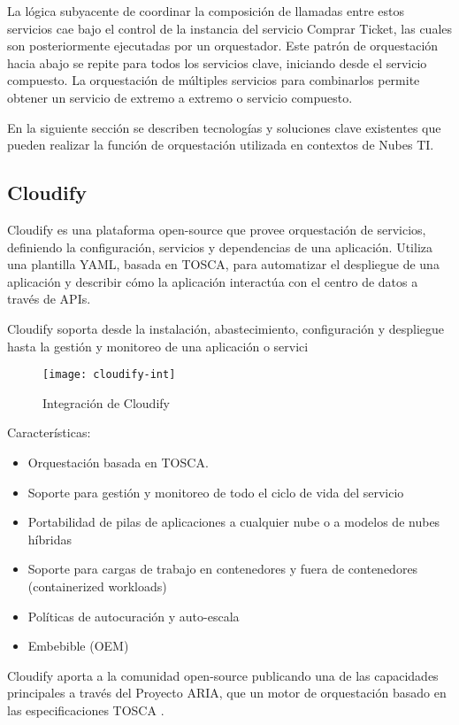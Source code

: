         La lógica subyacente de coordinar la composición de llamadas entre estos servicios cae bajo el control de la instancia del servicio Comprar Ticket, las cuales son posteriormente ejecutadas por un orquestador.  Este patrón de orquestación hacia abajo se repite para todos los servicios clave, iniciando desde el servicio compuesto. La orquestación de múltiples servicios para combinarlos permite obtener un servicio de extremo a extremo o servicio compuesto. 
        
        En la siguiente sección se describen tecnologías y soluciones clave existentes que pueden realizar la función de orquestación utilizada en contextos de Nubes TI.
	    
	    \subsection{Cloudify}
        Cloudify \cite{Cloudify2016-qi} es una plataforma open-source que provee orquestación de servicios, definiendo la configuración, servicios y dependencias de una aplicación. Utiliza una plantilla YAML, basada en TOSCA, para automatizar el despliegue de una aplicación y describir cómo la aplicación interactúa con el centro de datos a través de APIs.
        
        Cloudify soporta desde la instalación, abastecimiento, configuración y despliegue hasta la gestión y monitoreo de una aplicación o servici
    	    
\begin{figure}[H]
    \centering
    \texttt{[image: cloudify-int]}
    \caption{Integración de Cloudify \protect\cite{Cloudify2016-je}}
    \label{fig:cloudify-int}
\end{figure}
    
Características:
\begin{itemize}
\item Orquestación basada en TOSCA.
\item Soporte para gestión y monitoreo de todo el ciclo de vida del servicio
\item Portabilidad de pilas de aplicaciones a cualquier nube o a modelos de nubes híbridas
\item Soporte para cargas de trabajo en contenedores y fuera de contenedores (containerized workloads)
\item Políticas de autocuración y auto-escala
\item Embebible (OEM)
\end{itemize}
Cloudify aporta a la comunidad open-source publicando una de las capacidades principales a través del Proyecto ARIA, que un motor de orquestación basado en las especificaciones TOSCA 
\cite{Oasis2016-sk}.


